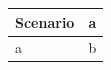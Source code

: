 \begin{tabular}{ll}
  \toprule
  {Scenario} & a \\
  \midrule
  a          & b \\
  \bottomrule
\end{tabular}
